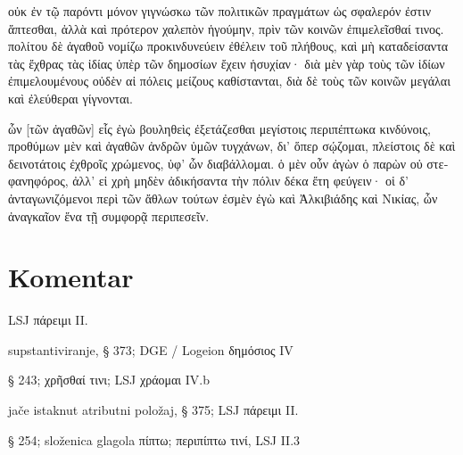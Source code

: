 {\large

\begin{greek}

\noindent οὐκ ἐν τῷ παρόντι μόνον γιγνώσκω τῶν πολιτικῶν πραγμάτων ὡς σφαλερόν ἐστιν ἅπτεσθαι, ἀλλὰ καὶ πρότερον χαλεπὸν ἡγούμην, πρὶν τῶν κοινῶν ἐπιμελεῖσθαί τινος. πολίτου δὲ ἀγαθοῦ νομίζω προκινδυνεύειν ἐθέλειν τοῦ πλήθους, καὶ μὴ καταδείσαντα τὰς ἔχθρας τὰς ἰδίας ὑπὲρ τῶν δημοσίων ἔχειν ἡσυχίαν· διὰ μὲν γὰρ τοὺς τῶν ἰδίων ἐπιμελουμένους οὐδὲν αἱ πόλεις μείζους καθίστανται, διὰ δὲ τοὺς τῶν κοινῶν μεγάλαι καὶ ἐλεύθεραι γίγνονται.

ὧν [τῶν ἀγαθῶν] εἷς ἐγὼ βουληθεὶς ἐξετάζεσθαι μεγίστοις περιπέπτωκα κινδύνοις, προθύμων μὲν καὶ ἀγαθῶν ἀνδρῶν ὑμῶν τυγχάνων, δι' ὅπερ σῴζομαι, πλείστοις δὲ καὶ δεινοτάτοις ἐχθροῖς χρώμενος, ὑφ' ὧν διαβάλλομαι. ὁ μὲν οὖν ἀγὼν ὁ παρὼν οὐ στεφανηφόρος, ἀλλ' εἰ χρὴ μηδὲν ἀδικήσαντα τὴν πόλιν δέκα ἔτη φεύγειν· οἱ δ' ἀνταγωνιζόμενοι περὶ τῶν ἄθλων τούτων ἐσμὲν ἐγὼ καὶ Ἀλκιβιάδης καὶ Νικίας, ὧν ἀναγκαῖον ἕνα τῇ συμφορᾷ περιπεσεῖν.

\end{greek}

}


\section*{Komentar}



\begin{description}[noitemsep]
\item[ἐν τῷ παρόντι] LSJ πάρειμι II.
\end{description}


\begin{description}[noitemsep]
\item[τῶν δημοσίων] supstantiviranje, § 373; DGE / Logeion δημόσιος IV
\end{description}



\begin{description}[noitemsep]
\item[χρώμενος] § 243; χρῆσθαί τινι; LSJ χράομαι IV.b %
\end{description}

\begin{description}[noitemsep]
\item[ὁ\dots\ ἀγὼν ὁ παρὼν] jače istaknut atributni položaj, § 375; LSJ πάρειμι II.%
\item[περιπεσεῖν] § 254; složenica glagola πίπτω; περιπίπτω τινί, LSJ II.3 %

\end{description}

